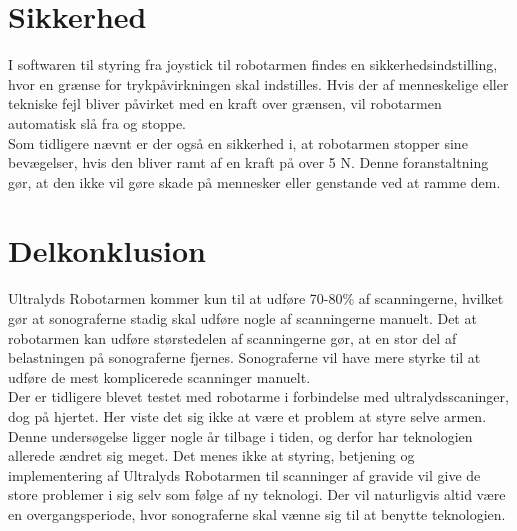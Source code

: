 \section{Sikkerhed}
I softwaren til styring fra joystick til robotarmen findes en sikkerhedsindstilling, hvor en grænse for trykpåvirkningen skal indstilles. Hvis der af menneskelige eller tekniske fejl bliver påvirket med en kraft over grænsen, vil robotarmen automatisk slå fra og stoppe. \\
Som tidligere nævnt er der også en sikkerhed i, at robotarmen stopper sine bevægelser, hvis den bliver ramt af en kraft på over 5 N. Denne foranstaltning gør, at den ikke vil gøre skade på mennesker eller genstande ved at ramme dem. 

\section{Delkonklusion}
Ultralyds Robotarmen kommer kun til at udføre 70-80\% af scanningerne, hvilket gør at sonograferne stadig skal udføre nogle af scanningerne manuelt. Det at robotarmen kan udføre størstedelen af scanningerne gør, at en stor del af belastningen på sonograferne fjernes. Sonograferne vil have mere styrke til at udføre de mest komplicerede scanninger manuelt.\\

Der er tidligere blevet testet med robotarme i forbindelse med ultralydsscaninger, dog på hjertet. Her viste det sig ikke at være et problem at styre selve armen.  Denne undersøgelse ligger nogle år tilbage i tiden, og derfor har teknologien allerede ændret sig meget. Det menes ikke at styring, betjening og implementering af Ultralyds Robotarmen til scanninger af gravide vil give de store problemer i sig selv som følge af ny teknologi. Der vil naturligvis altid være en overgangsperiode, hvor sonograferne skal vænne sig til at benytte teknologien. 